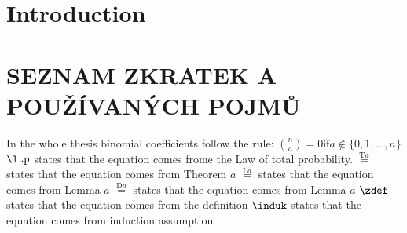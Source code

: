 \chapter*{Introduction}
\chapter*{SEZNAM ZKRATEK A POUŽÍVANÝCH POJMŮ}
In the whole thesis binomial coefficients follow the rule: $\binom{n}{a}=0 \text{if} a\not\in \{0,1,\ldots, n\}$
$\ltp$ states that the equation comes frome the Law of total probability.
$\overset{\text{T}a}{=}$ states that the equation comes from Theorem $a$
$\overset{\text{L}a}{=}$ states that the equation comes from Lemma $a$
$\overset{\text{D}a}{=}$ states that the equation comes from Lemma $a$
$\zdef$ states that the equation comes from the definition
$\induk$ states that the equation comes from induction assumption
